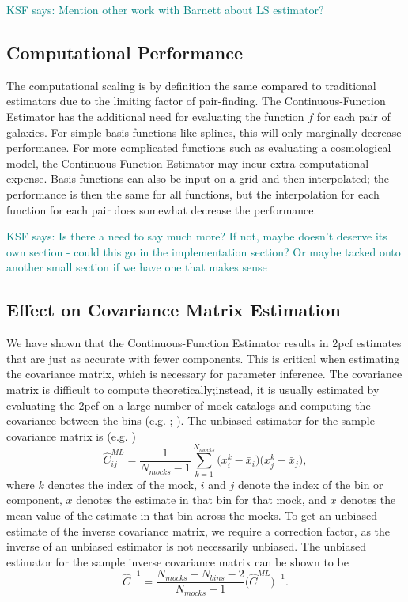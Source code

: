 \documentclass[modern]{aastex62}
\newcommand{\cf}{2pcf\xspace} %
\newcommand{\Est}{The Continuous-Function Estimator\xspace}
\newcommand{\est}{the Continuous-Function Estimator\xspace}
\newcommand{\inv}{^{-1}}
\newcommand{\KSF}[1]{\textcolor{teal}{KSF says: #1}}
\begin{document}
\KSF{Mention other work with Barnett about LS estimator?}

\subsection{Computational Performance}

The computational scaling is by definition the same compared to traditional estimators due to the limiting factor of pair-finding.
\Est has the additional need for evaluating the function $f$ for each pair of galaxies.
For simple basis functions like splines, this will only marginally decrease performance.
For more complicated functions such as evaluating a cosmological model, \est may incur extra computational expense.
Basis functions can also be input on a grid and then interpolated; the performance is then the same for all functions, but the interpolation for each function for each pair does somewhat decrease the performance.

\KSF{Is there a need to say much more? If not, maybe doesn't deserve its own section - could this go in the implementation section? Or maybe tacked onto another small section if we have one that makes sense}

\subsection{Effect on Covariance Matrix Estimation}

We have shown that \est results in \cf estimates that are just as accurate with fewer components.
This is critical when estimating the covariance matrix, which is necessary for parameter inference.
The covariance matrix is difficult to compute theoretically;instead, it is usually estimated by evaluating the \cf on a large number of mock catalogs and computing the covariance between the bins (e.g. \citealt{Reid2010}; \citealt{Anderson2014}).
The unbiased estimator for the sample covariance matrix is (e.g. \citealt{Anderson2003})
\begin{equation}
\hat{C}^{ML}_{ij} = \frac{1}{N_{mocks}-1} \sum_{k=1}^{N_{mocks}} \bigg( x^k_i - \bar{x}_i \bigg) \bigg( x^k_j - \bar{x}_j \bigg),
\end{equation}
where $k$ denotes the index of the mock, $i$ and $j$ denote the index of the bin or component, $x$ denotes the estimate in that bin for that mock, and $\bar{x}$ denotes the mean value of the estimate in that bin across the mocks.
To get an unbiased estimate of the inverse covariance matrix, we require a correction factor, as the inverse of an unbiased estimator is not necessarily unbiased.
The unbiased estimator for the sample inverse covariance matrix can be shown to be \citep{Hartlap2007}
\begin{equation}
\hat{C}\inv = \frac{N_{mocks}-N_{bins}-2}{N_{mocks}-1} \bigg( \hat{C}^{ML}\bigg) \inv.
\end{equation}
\end{document}
